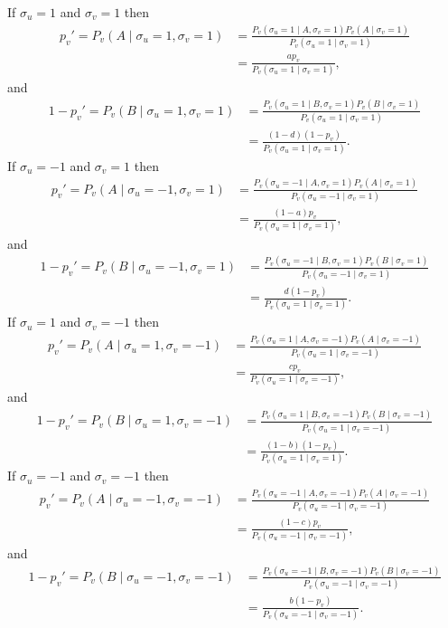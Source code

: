 If \(\sigma_u=1\) and \(\sigma_v=1\) then
\be
\begin{align*}
	p_v'=P_v(A\mid \sigma_u=1, \sigma_v=1)&=\frac{P_v(\sigma_u=1\mid A,\sigma_v=1) P_v(A\mid\sigma_v=1)}{P_v(\sigma_u=1\mid\sigma_v=1)}\\
										  &=\frac{a p_v}{P_v(\sigma_u=1\mid\sigma_v=1)},
\end{align*}
\ee
and
\be
\begin{align*}
	1-p_v'=P_v(B\mid \sigma_u=1, \sigma_v=1)&=\frac{P_v(\sigma_u=1\mid B,\sigma_v=1) P_v(B\mid\sigma_v=1)}{P_v(\sigma_u=1\mid\sigma_v=1)}\\
										  &=\frac{(1-d) (1-p_v)}{P_v(\sigma_u=1\mid\sigma_v=1)}.
\end{align*}
\ee
If \(\sigma_u=-1\) and \(\sigma_v=1\) then
\be
\begin{align*}
	p_v'=P_v(A\mid \sigma_u=-1, \sigma_v=1)&=\frac{P_v(\sigma_u=-1\mid A,\sigma_v=1) P_v(A\mid\sigma_v=1)}{P_v(\sigma_u=-1\mid\sigma_v=1)}\\
										  &=\frac{(1-a) p_v}{P_v(\sigma_u=1\mid\sigma_v=1)},
\end{align*}
\ee
and
\be
\begin{align*}
	1-p_v'=P_v(B\mid \sigma_u=-1, \sigma_v=1)&=\frac{P_v(\sigma_u=-1\mid B,\sigma_v=1) P_v(B\mid\sigma_v=1)}{P_v(\sigma_u=-1\mid\sigma_v=1)}\\
										  &=\frac{d (1-p_v)}{P_v(\sigma_u=1\mid\sigma_v=1)}.
\end{align*}
\ee
If \(\sigma_u=1\) and \(\sigma_v=-1\) then
\be
\begin{align*}
	p_v'=P_v(A\mid \sigma_u=1, \sigma_v=-1)&=\frac{P_v(\sigma_u=1\mid A,\sigma_v=-1) P_v(A\mid\sigma_v=-1)}{P_v(\sigma_u=1\mid\sigma_v=-1)}\\
										  &=\frac{c p_v}{P_v(\sigma_u=1\mid\sigma_v=-1)},
\end{align*}
\ee
and
\be
\begin{align*}
	1-p_v'=P_v(B\mid \sigma_u=1, \sigma_v=-1)&=\frac{P_v(\sigma_u=1\mid B,\sigma_v=-1) P_v(B\mid\sigma_v=-1)}{P_v(\sigma_u=1\mid\sigma_v=-1)}\\
										  &=\frac{(1-b) (1-p_v)}{P_v(\sigma_u=1\mid\sigma_v=1)}.
\end{align*}
\ee
If \(\sigma_u=-1\) and \(\sigma_v=-1\) then
\be
\begin{align*}
	p_v'=P_v(A\mid \sigma_u=-1, \sigma_v=-1)&=\frac{P_v(\sigma_u=-1\mid A,\sigma_v=-1) P_v(A\mid\sigma_v=-1)}{P_v(\sigma_u=-1\mid\sigma_v=-1)}\\
										  &=\frac{(1-c) p_v}{P_v(\sigma_u=-1\mid\sigma_v=-1)},
\end{align*}
\ee
and
\be
\begin{align*}
	1-p_v'=P_v(B\mid \sigma_u=-1, \sigma_v=-1)&=\frac{P_v(\sigma_u=-1\mid B,\sigma_v=-1) P_v(B\mid\sigma_v=-1)}{P_v(\sigma_u=-1\mid\sigma_v=-1)}\\
										  &=\frac{b (1-p_v)}{P_v(\sigma_u=-1\mid\sigma_v=-1)}.
\end{align*}
\ee

